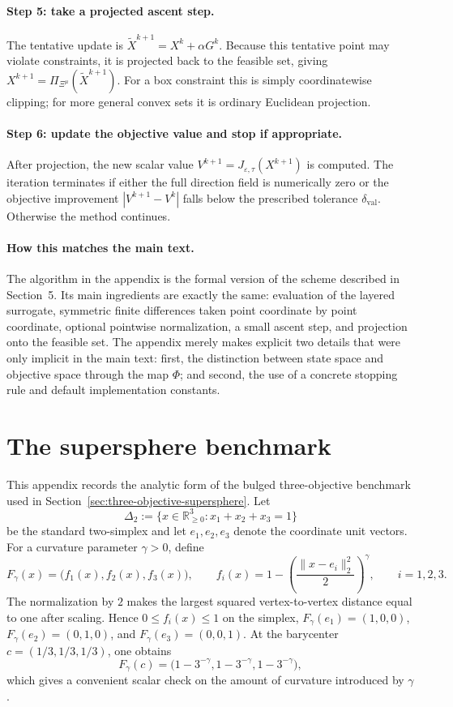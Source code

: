 \documentclass{article}
\begin{document}
\paragraph{Step 5: take a projected ascent step.}
The tentative update is $\widetilde X^{k+1}=X^{k}+\alpha G^{k}$. Because this tentative point may violate constraints, it is projected back to the feasible set, giving $X^{k+1}=\Pi_{\Xi^{\mu}}(\widetilde X^{k+1})$. For a box constraint this is simply coordinatewise clipping; for more general convex sets it is ordinary Euclidean projection.

\paragraph{Step 6: update the objective value and stop if appropriate.}
After projection, the new scalar value $V^{k+1}=J_{\varepsilon,\tau}(X^{k+1})$ is computed. The iteration terminates if either the full direction field is numerically zero or the objective improvement $|V^{k+1}-V^{k}|$ falls below the prescribed tolerance $\delta_{\mathrm{val}}$. Otherwise the method continues.

\paragraph{How this matches the main text.}
The algorithm in the appendix is the formal version of the scheme described in Section~5. Its main ingredients are exactly the same: evaluation of the layered surrogate, symmetric finite differences taken point coordinate by point coordinate, optional pointwise normalization, a small ascent step, and projection onto the feasible set. The appendix merely makes explicit two details that were only implicit in the main text: first, the distinction between state space and objective space through the map $\Phi$; and second, the use of a concrete stopping rule and default implementation constants.


\section{The supersphere benchmark}
\label{app:supersphere-benchmark}

This appendix records the analytic form of the bulged three-objective benchmark used in Section~\ref{sec:three-objective-supersphere}.  Let
\[
\Delta_2:=\{x\in\mathbb{R}^3_{\ge 0}:x_1+x_2+x_3=1\}
\]
be the standard two-simplex and let $e_1,e_2,e_3$ denote the coordinate unit vectors.  For a curvature parameter $\gamma>0$, define
\[
F_\gamma(x)=\bigl(f_1(x),f_2(x),f_3(x)\bigr),\qquad
f_i(x)=1-\left(\frac{\|x-e_i\|_2^2}{2}\right)^\gamma,
\qquad i=1,2,3.
\]
The normalization by $2$ makes the largest squared vertex-to-vertex distance equal to one after scaling.  Hence $0\le f_i(x)\le 1$ on the simplex, $F_\gamma(e_1)=(1,0,0)$, $F_\gamma(e_2)=(0,1,0)$, and $F_\gamma(e_3)=(0,0,1)$.  At the barycenter $c=(1/3,1/3,1/3)$, one obtains
\[
F_\gamma(c)=\bigl(1-3^{-\gamma},1-3^{-\gamma},1-3^{-\gamma}\bigr),
\]
which gives a convenient scalar check on the amount of curvature introduced by $\gamma$.
\end{document}
